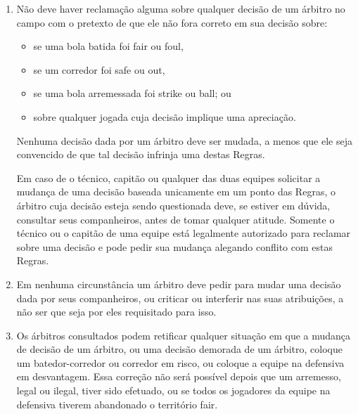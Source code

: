 \begin{enumerate}[label=(\alph*)]
	\item Não deve haver reclamação alguma sobre qualquer decisão de um árbitro no campo com o pretexto de que ele não fora correto em sua decisão sobre:
	\begin{itemize}
		\item se uma bola batida foi \gls{fair} ou \gls{foul},
		\item se um corredor foi \gls{safe} ou \gls{out},
		\item se uma bola arremessada foi \gls{strike} ou \gls{ball}; ou
		\item sobre qualquer jogada cuja decisão implique uma apreciação.
	\end{itemize}


	Nenhuma decisão dada por um árbitro deve ser mudada, a menos que ele seja convencido de que tal decisão infrinja uma destas Regras.

	Em caso de o técnico, capitão ou qualquer das duas equipes solicitar a mudança de uma decisão baseada unicamente em um ponto das Regras, o árbitro cuja decisão esteja sendo questionada deve, se estiver em dúvida, consultar seus companheiros, antes de tomar qualquer atitude. Somente o técnico ou o capitão de uma equipe está legalmente autorizado para reclamar sobre uma decisão e pode pedir sua mudança alegando conflito com estas Regras.

	\item  Em nenhuma circunstância um árbitro deve pedir para mudar uma decisão dada por seus companheiros, ou criticar ou interferir nas suas atribuições, a não ser que seja por eles requisitado para isso.

	\item  Os árbitros consultados podem retificar qualquer situação em que a mudança de decisão de um árbitro, ou uma decisão demorada de um árbitro, coloque um batedor-corredor ou corredor em risco, ou coloque a equipe na defensiva em  desvantagem. Essa correção não será possível depois que um arremesso, legal ou ilegal, tiver sido efetuado, ou se todos os jogadores da equipe na defensiva tiverem abandonado o território \gls{fair}.
\end{enumerate}

